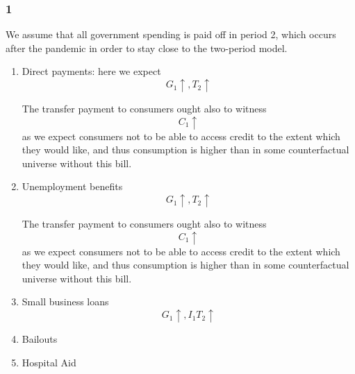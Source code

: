 \documentclass[12pt,letterpaper]{article}
\theoremstyle{definition}
\begin{document}
\subsubsection*{1}

We assume that all government spending is paid off in period 2, which occurs
after the pandemic in order to stay close to the two-period model.

\begin{enumerate}
\item Direct payments: here we expect
  \[
    G_1 \uparrow, T_2 \uparrow
  \]

  The transfer payment to consumers ought also to witness
  \[
    C_1 \uparrow
  \]
  as we expect consumers not to be able to access credit to the extent which
  they would like, and thus consumption is higher than in some counterfactual
  universe without this bill.

\item Unemployment benefits
  \[
    G_1 \uparrow, T_2 \uparrow
  \]

  The transfer payment to consumers ought also to witness
  \[
    C_1 \uparrow
  \]
  as we expect consumers not to be able to access credit to the extent which
  they would like, and thus consumption is higher than in some counterfactual
  universe without this bill.

\item Small business loans
  \[
    G_1 \uparrow, I_1 T_2 \uparrow
  \]

\item Bailouts
  \[
  \]

\item Hospital Aid
  \[
  \]
\end{enumerate}
\end{document}
